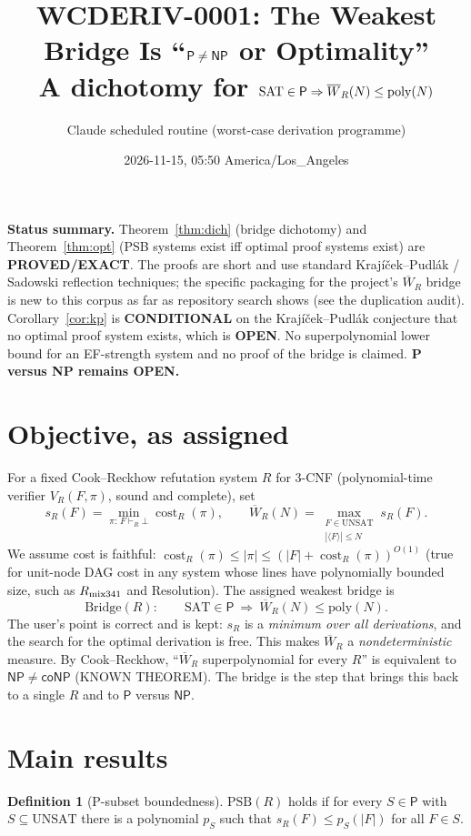 \documentclass[11pt]{article}
\title{WCDERIV-0001: The Weakest Bridge Is ``$\Pc\ne\NP$ or Optimality''\\
\large A dichotomy for $\SAT\in\Pc\Rightarrow\Wbar_R(N)\le\mathrm{poly}(N)$}
\author{Claude scheduled routine (worst-case derivation programme)}
\date{2026-11-15, 05:50 America/Los\_Angeles}
\theoremstyle{definition}
\newtheorem{definition}[theorem]{Definition}
\newcommand{\Wbar}{\overline{W}}
\newcommand{\UNSAT}{\mathrm{UNSAT}}
\newcommand{\SAT}{\mathrm{SAT}}
\newcommand{\Pc}{\mathsf{P}}
\newcommand{\NP}{\mathsf{NP}}
\newcommand{\PSB}{\mathrm{PSB}}
\newcommand{\Bridge}{\mathrm{Bridge}}
\begin{document}
\maketitle

\noindent\textbf{Status summary.}
Theorem~\ref{thm:dich} (bridge dichotomy) and Theorem~\ref{thm:opt}
(PSB systems exist iff optimal proof systems exist) are
\textbf{PROVED/EXACT}. The proofs are short and use standard
Krajíček--Pudlák / Sadowski reflection techniques; the specific packaging for
the project's $\Wbar_R$ bridge is new to this corpus as far as repository search
shows (see the duplication audit).
Corollary~\ref{cor:kp} is \textbf{CONDITIONAL} on the Krajíček--Pudlák
conjecture that no optimal proof system exists, which is \textbf{OPEN}.
No superpolynomial lower bound for an EF-strength system and no proof of the
bridge is claimed.
\textbf{P versus NP remains OPEN.}

\section{Objective, as assigned}
For a fixed Cook--Reckhow refutation system $R$ for 3-CNF (polynomial-time
verifier $V_R(F,\pi)$, sound and complete), set
\[
 s_R(F)=\min_{\pi:\,F\vdash_R\bot}\operatorname{cost}_R(\pi),\qquad
 \Wbar_R(N)=\max_{\substack{F\in\UNSAT\\ |\langle F\rangle|\le N}} s_R(F).
\]
We assume cost is faithful: $\operatorname{cost}_R(\pi)\le|\pi|\le
(|F|+\operatorname{cost}_R(\pi))^{O(1)}$ (true for unit-node DAG cost in any
system whose lines have polynomially bounded size, such as $R_{\rm mix341}$ and
Resolution). The assigned weakest bridge is
\[
 \Bridge(R):\qquad \SAT\in\Pc\ \Longrightarrow\ \Wbar_R(N)\le\mathrm{poly}(N).
\]
The user's point is correct and is kept: $s_R$ is a \emph{minimum over all
derivations}, and the search for the optimal derivation is free. This makes
$\Wbar_R$ a \emph{nondeterministic} measure. By Cook--Reckhow,
``$\Wbar_R$ superpolynomial for every $R$'' is equivalent to
$\NP\ne\mathsf{coNP}$ (KNOWN THEOREM). The bridge is the step that brings this
back to a single $R$ and to $\Pc$ versus $\NP$.

\section{Main results}
\begin{definition}[P-subset boundedness]
$\PSB(R)$ holds if for every $S\in\Pc$ with $S\subseteq\UNSAT$ there is a
polynomial $p_S$ such that $s_R(F)\le p_S(|F|)$ for all $F\in S$.
\end{definition}
\end{document}

